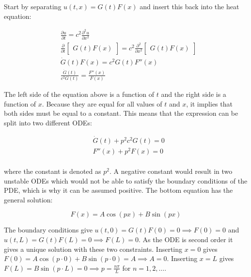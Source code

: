 Start by separating $u(t, x) = G(t) F(x)$ and insert this back into the heat equation:

\begin{equation*}
    \begin{aligned}
        & \frac{\partial u}{\partial t} = c^2 \frac{\partial^2 u}{\partial x^2} \\
        & \frac{\partial}{\partial t} \begin{bmatrix} G(t) F(x) \end{bmatrix} = c^2 \frac{\partial^2}{\partial x^2} \begin{bmatrix} G(t) F(x) \end{bmatrix} \\
        & \dot{G}(t) F(x) = c^2 G(t) F''(x) \\
        & \frac{\dot{G}(t)}{c^2 G(t)} = \frac{F''(x)}{F(x)}
    \end{aligned}
\end{equation*}

The left side of the equation above is a function of $t$ and the right side is a function of $x$. Because they are equal for all values of $t$ and $x$, it implies that both sides must be equal to a constant. This means that the expression can be split into two different ODEs:

\begin{equation*}
    \begin{aligned}
        & \dot{G}(t) + p^2 c^2 G(t) = 0 \\
        & F''(x) + p^2 F(x) = 0 \\
    \end{aligned}
\end{equation*}

\noindent where the constant is denoted as $p^2$. A negative constant would result in two unstable ODEs which would not be able to satisfy the boundary conditions of the PDE, which is why it can be assumed positive. The bottom equation has the general solution:

\begin{equation*}
    F(x) = A \cos(p x) + B \sin(p x)
\end{equation*}

The boundary conditions give $u(t, 0) = G(t)F(0) = 0 \implies F(0) = 0$ and $u(t, L) = G(t)F(L) = 0 \implies F(L) = 0$. As the ODE is second order it gives a unique solution with these two constraints. Inserting $x = 0$ gives $F(0) = A \cos(p \cdot 0) + B \sin(p \cdot 0) = A \implies A = 0$. Inserting $x = L$ gives $F(L) = B \sin(p \cdot L) = 0 \implies p = \frac{n \pi}{L}$ for $n = 1, 2, \dots$.

